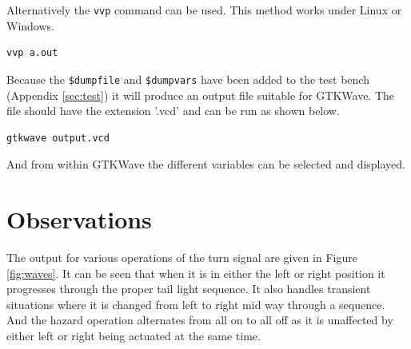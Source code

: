 \documentclass[12pt]{article}
\begin{document}
Alternatively the \verb+vvp+ command can be used.
This method works under Linux or Windows.

\begin{verbatim}
vvp a.out
\end{verbatim}

Because the \verb+$dumpfile+ and \verb+$dumpvars+ have been
added to the test bench (Appendix \ref{sec:test})
it will produce an output file suitable for GTKWave\cite{GTKWAVE}.
The file should have the extension '.vcd' and can
be run as shown below.

\begin{verbatim}
gtkwave output.vcd
\end{verbatim}

And from within GTKWave the different variables can be selected
and displayed.



\section{Observations}

The output for various operations of the turn signal are given
in Figure \ref{fig:waves}.
It can be seen that when it is in either the left or right
position it progresses through the proper tail light sequence.
It also handles transient situations where it is changed from
left to right mid way through a sequence.
And the hazard operation alternates from all on to all off
as it is unaffected by either left or right being actuated at the same time.
\end{document}
